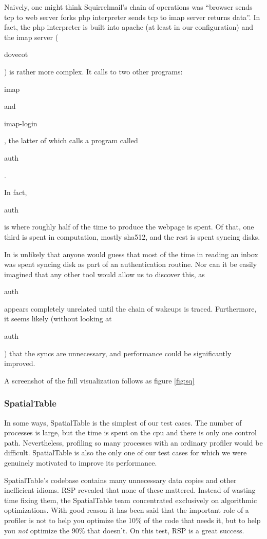 \documentclass[10pt]{article}
\begin{document}
Naively, one might think Squirrelmail's chain of operations was ``browser sends tcp to web server forks php interpreter sends tcp to imap server returns data''.  In fact, the php interpreter is built into apache (at least in our configuration) and the imap server (\begin{tt}dovecot\end{tt}) is rather more complex.  It calls to two other programs: \begin{tt}imap\end{tt} and \begin{tt}imap-login\end{tt}, the latter of which calls a program called \begin{tt}auth\end{tt}.

In fact, \begin{tt}auth\end{tt} is where roughly half of the time to produce the webpage is spent.  Of that, one third is spent in computation, mostly sha512, and the rest is spent syncing disks.

In is unlikely that anyone would guess that most of the time in reading an inbox was spent syncing disk as part of an authentication routine.  Nor can it be easily imagined that any other tool would allow us to discover this, as \begin{tt}auth\end{tt} appears completely unrelated until the chain of wakeups is traced.  Furthermore, it seems likely (without looking at \begin{tt}auth\end{tt}) that the syncs are unnecessary, and performance could be significantly improved.

A screenshot of the full visualization follows as figure \ref{fig:sq}

\subsubsection{SpatialTable}

In some ways, SpatialTable is the simplest of our test cases.  The number of processes is large, but the time is spent on the cpu and there is only one control path.  Nevertheless, profiling so many processes with an ordinary profiler would be difficult. SpatialTable is also the only one of our test cases for which we were genuinely motivated to improve its performance.

SpatialTable's codebase contains many unnecessary data copies and other inefficient idioms.  RSP revealed that none of these mattered.  Instead of wasting time fixing them, the SpatialTable team concentrated exclusively on algorithmic optimizations.  With good reason it has been said that the important role of a profiler is not to help you optimize the 10\% of the code that needs it, but to help you \emph{not} optimize the 90\% that doesn't\cite{taoup}.  On this test, RSP is a great success.
\end{document}
